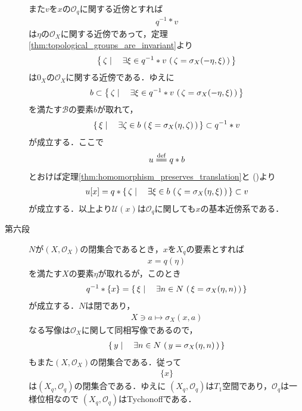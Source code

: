 \begin{sketch}
\begin{description}
				また$v$を$x$の$\mathscr{O}_q$に関する近傍とすれば
				\begin{align}
					q^{-1} \ast v
				\end{align}
				は$\eta$の$\mathscr{O}_X$に関する近傍であって，定理\ref{thm:topological_groups_are_invariant}より
				\begin{align}
					\left\{\, \zeta \mid \quad \exists \xi \in q^{-1} \ast v\, \left(\, \zeta = \sigma_X(-\eta,\xi)\, \right)\, \right\}
				\end{align}
				は$0_X$の$\mathscr{O}_X$に関する近傍である．ゆえに
				\begin{align}
					b \subset \left\{\, \zeta \mid \quad \exists \xi \in q^{-1} \ast v\, \left(\, \zeta = \sigma_X(-\eta,\xi)\, \right)\, \right\}
				\end{align}
				を満たす$\mathscr{B}$の要素$b$が取れて，
				\begin{align}
					\left\{\, \xi \mid \quad \exists \zeta \in b\, \left(\, \xi = \sigma_X(\eta,\zeta)\, \right)\, \right\}
					\subset q^{-1} \ast v
				\end{align}
				が成立する．ここで
				\begin{align}
					u \defeq q \ast b
				\end{align}
				とおけば定理\ref{thm:homomorphism_preserves_translation}と
				()より
				\begin{align}
					u[x] = q \ast \left\{\, \zeta \mid \quad \exists \xi \in b\, \left(\, \zeta = \sigma_X(\eta,\xi)\, \right)\, \right\}
					\subset v
				\end{align}
				が成立する．以上より$\mathscr{U}(x)$は$\mathscr{O}_q$に関しても$x$の基本近傍系である．
				
			\item[第六段]
				$N$が$(X,\mathscr{O}_X)$の閉集合であるとき，$x$を$X_q$の要素とすれば
				\begin{align}
					x = q(\eta)
				\end{align}
				を満たす$X$の要素$\eta$が取れるが，このとき
				\begin{align}
					q^{-1} \ast \{x\} = \left\{\, \xi \mid \quad \exists n \in N\, \left(\, \xi = \sigma_X(\eta,n)\, \right)\, \right\}
				\end{align}
				が成立する．$N$は閉であり，
				\begin{align}
					X \ni a \longmapsto \sigma_X(x,a)
				\end{align}
				なる写像は$\mathscr{O}_X$に関して同相写像であるので，
				\begin{align}
					\left\{\, y \mid \quad \exists n \in N\, \left(\, y = \sigma_X(\eta,n)\, \right)\, \right\}
				\end{align}
				もまた$(X,\mathscr{O}_X)$の閉集合である．従って
				\begin{align}
					\{x\}
				\end{align}
				は$(X_q,\mathscr{O}_q)$の閉集合である．ゆえに
				$(X_q,\mathscr{O}_q)$は$T_1$空間であり，$\mathscr{O}_q$は一様位相なので
				$(X_q,\mathscr{O}_q)$はTychonoffである．
				\QED
		\end{description}
	\end{sketch}
	
